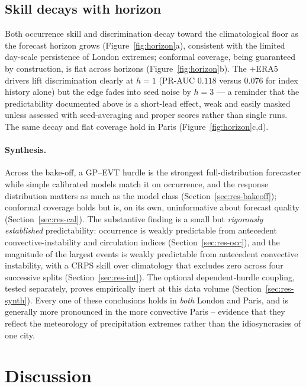 \documentclass[11pt,a4paper]{article}
\begin{document}
\subsection{Skill decays with horizon}\label{sec:res-skill}
Both occurrence skill and discrimination decay toward the climatological floor as
the forecast horizon grows (Figure~\ref{fig:horizon}a), consistent with the
limited day-scale persistence of London extremes; conformal coverage, being
guaranteed by construction, is flat across horizons (Figure~\ref{fig:horizon}b).
The $+$ERA5 drivers lift discrimination clearly at $h=1$ (PR-AUC $0.118$ versus
$0.076$ for index history alone) but the edge fades into seed noise by $h=3$ --- a
reminder that the predictability documented above is a short-lead effect, weak and
easily masked unless assessed with seed-averaging and proper scores rather than
single runs. The same decay and flat coverage hold in Paris (Figure~\ref{fig:horizon}c,d).



\paragraph{Synthesis.} Across the bake-off, a GP--EVT hurdle is the strongest
full-distribution forecaster while simple calibrated models match it on
occurrence, and the response distribution matters as much as the model class
(Section~\ref{sec:res-bakeoff}); conformal coverage holds but is, on
its own, uninformative about forecast quality (Section~\ref{sec:res-cal}). The
substantive finding is a small but
\emph{rigorously established} predictability: occurrence is weakly predictable
from antecedent convective-instability and circulation indices
(Section~\ref{sec:res-occ}), and the magnitude of the largest events is weakly
predictable from antecedent convective instability, with a CRPS skill over
climatology that excludes zero across four successive splits
(Section~\ref{sec:res-int}). The optional dependent-hurdle coupling, tested
separately, proves empirically inert at this data volume
(Section~\ref{sec:res-synth}). Every one of these
conclusions holds in \emph{both} London and Paris, and is generally more
pronounced in the more convective Paris -- evidence that they reflect the
meteorology of precipitation extremes rather than the idiosyncrasies of one city.

\section{Discussion}\label{sec:discussion}
\end{document}
